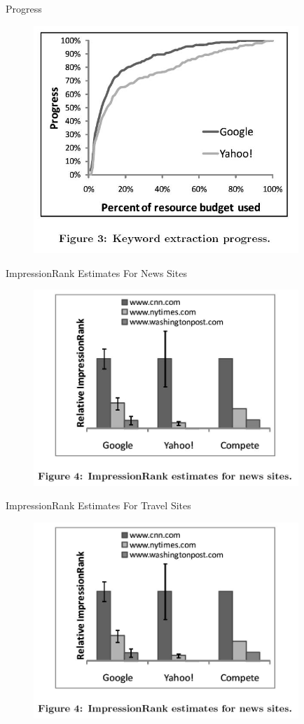 \documentclass{beamer}
\begin{document}
    \begin{frame}[plain]{Progress}
        \begin{figure}
        \includegraphics[width=100mm]{f3}
        \end{figure}
    \end{frame}

    \begin{frame}[plain]{ImpressionRank Estimates For News Sites}
        \begin{figure}
        \includegraphics[width=100mm]{f4}
        \end{figure}
    \end{frame}

    \begin{frame}[plain]{ImpressionRank Estimates For Travel Sites}
        \begin{figure}
        \includegraphics[width=100mm]{f4}
        \end{figure}
    \end{frame}
\end{document}
